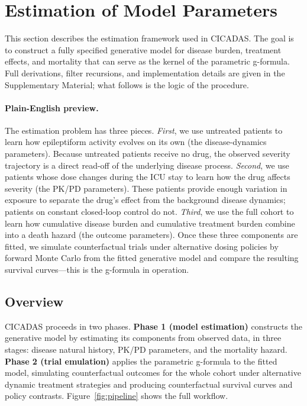 \section{Estimation of Model Parameters}
\label{sec:estimation}
This section describes the estimation framework used in CICADAS. The goal is to construct a fully
specified generative model for disease burden, treatment effects, and mortality that can serve as the
kernel of the parametric g-formula. Full derivations, filter recursions, and implementation details
are given in the Supplementary Material; what follows is the logic of the procedure.

\paragraph{Plain-English preview.} The estimation problem has three pieces. \emph{First}, we use
untreated patients to learn how epileptiform activity evolves on its own (the disease-dynamics
parameters). Because untreated patients receive no drug, the observed severity trajectory is a direct
read-off of the underlying disease process. \emph{Second}, we use patients whose dose changes during
the ICU stay to learn how the drug affects severity (the PK/PD parameters). These patients provide
enough variation in exposure to separate the drug's effect from the background disease dynamics;
patients on constant closed-loop control do not. \emph{Third}, we use the full cohort to learn how
cumulative disease burden and cumulative treatment burden combine into a death hazard (the outcome
parameters). Once these three components are fitted, we simulate counterfactual trials under
alternative dosing policies by forward Monte Carlo from the fitted generative model and compare the
resulting survival curves---this is the g-formula in operation.

\subsection{Overview}
CICADAS proceeds in two phases. \textbf{Phase 1 (model estimation)} constructs the generative model by
estimating its components from observed data, in three stages: disease natural history, PK/PD
parameters, and the mortality hazard. \textbf{Phase 2 (trial emulation)} applies the parametric
g-formula to the fitted model, simulating counterfactual outcomes for the whole cohort under
alternative dynamic treatment strategies and producing counterfactual survival curves and policy
contrasts. Figure~\ref{fig:pipeline} shows the full workflow.

